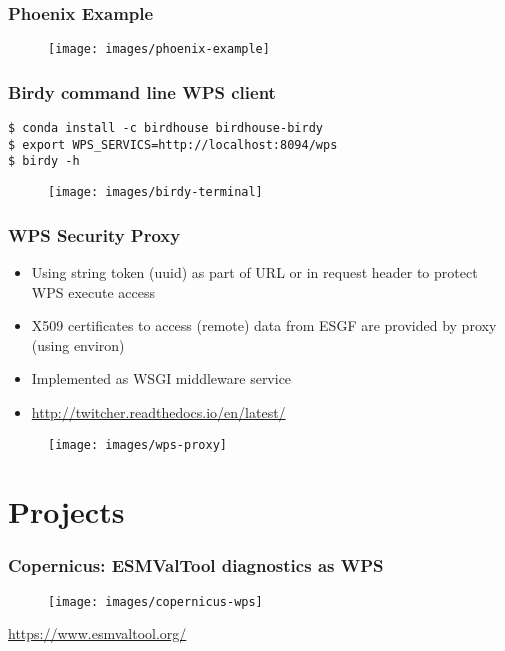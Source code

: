 \documentclass{beamer}
\begin{document}
\begin{frame}
  \frametitle<presentation>{Phoenix Example}
  \begin{figure}[ht]
    \centering
    \texttt{[image: images/phoenix-example]}
  \end{figure}
\end{frame}

\begin{frame}[fragile]
  \frametitle<presentation>{Birdy command line WPS client}
  \begin{verbatim}
$ conda install -c birdhouse birdhouse-birdy
$ export WPS_SERVICS=http://localhost:8094/wps
$ birdy -h
  \end{verbatim}
  \begin{figure}[ht]
    \centering
    \texttt{[image: images/birdy-terminal]}
  \end{figure}
\end{frame}

\begin{frame}
  \frametitle{WPS Security Proxy}
  \begin{itemize}
    \item Using string token (uuid) as part of URL or in request header to protect WPS execute access
    \item X509 certificates to access (remote) data from ESGF are provided by proxy (using environ)
    \item Implemented as WSGI middleware service
    \item \url{http://twitcher.readthedocs.io/en/latest/}
  \end{itemize}
  \begin{figure}
    \texttt{[image: images/wps-proxy]}
  \end{figure}
\end{frame}

\section{Projects}

\begin{frame}
\frametitle<presentation>{Copernicus: ESMValTool diagnostics as WPS}

  \begin{figure}[ht]
    \centering
    \texttt{[image: images/copernicus-wps]}
  \end{figure}

  \centering
  \footnotesize{\url{https://www.esmvaltool.org/}}

\end{frame}
\end{document}

